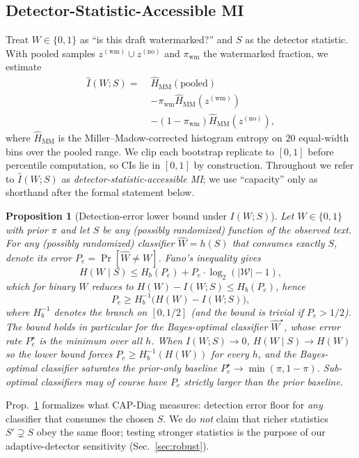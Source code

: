 \documentclass[11pt]{article}
\newtheorem{proposition}{Proposition}
\begin{document}
\subsection{Detector-Statistic-Accessible MI}
Treat $W\in\{0,1\}$ as ``is this draft watermarked?'' and $S$ as the
detector statistic. With pooled samples $z^{(\mathrm{wm})}\!\cup\!
z^{(\mathrm{no})}$ and $\pi_{\mathrm{wm}}$ the watermarked fraction, we
estimate
\begin{align*}
\hat{I}(W;S) =\; & \hat H_{\mathrm{MM}}(\mathrm{pooled}) \\
              & - \pi_{\mathrm{wm}} \hat H_{\mathrm{MM}}(z^{(\mathrm{wm})}) \\
              & - (1{-}\pi_{\mathrm{wm}}) \hat H_{\mathrm{MM}}(z^{(\mathrm{no})}),
\end{align*}
where $\hat H_{\mathrm{MM}}$ is the Miller--Madow-corrected histogram
entropy on $20$ equal-width bins over the pooled range. We clip each
bootstrap replicate to $[0,1]$ before percentile computation, so CIs lie in
$[0,1]$ by construction. Throughout we refer to $\hat I(W;S)$ as
\emph{detector-statistic-accessible MI}; we use ``capacity'' only as
shorthand after the formal statement below.

\begin{proposition}[Detection-error lower bound under $I(W;S)$]
\label{prop:bayes}
Let $W\in\{0,1\}$ with prior $\pi$ and let $S$ be any (possibly randomized)
function of the observed text. For \emph{any} (possibly randomized)
classifier $\hat W = h(S)$ that consumes exactly $S$, denote its error
$P_e = \Pr[\hat W \ne W]$. Fano's inequality gives
\[
H(W \mid S) \le H_b(P_e) + P_e \cdot \log_2(|\mathcal{W}|-1),
\]
which for binary $W$ reduces to $H(W) - I(W;S) \le H_b(P_e)$, hence
\[
P_e \ge H_b^{-1}\!\bigl(H(W) - I(W;S)\bigr),
\]
where $H_b^{-1}$ denotes the branch on $[0,1/2]$ (and the bound is
trivial if $P_e > 1/2$). The bound holds in particular for the
Bayes-optimal classifier $\hat W^\star$, whose error rate $P_e^\star$ is
the minimum over all $h$. When $I(W;S) \to 0$, $H(W\mid S)\to H(W)$ so
the lower bound forces $P_e \ge H_b^{-1}(H(W))$ for \emph{every} $h$, and
the Bayes-optimal classifier saturates the prior-only baseline
$P_e^\star \to \min(\pi, 1-\pi)$. Sub-optimal classifiers may of course
have $P_e$ strictly larger than the prior baseline.
\end{proposition}

Prop.~\ref{prop:bayes} formalizes what CAP-Diag measures: detection error
floor for \emph{any} classifier that consumes the chosen $S$. We do
\emph{not} claim that richer statistics $S'\supsetneq S$ obey the same
floor; testing stronger statistics is the purpose of our adaptive-detector
sensitivity (Sec.~\ref{sec:robust}).
\end{document}
